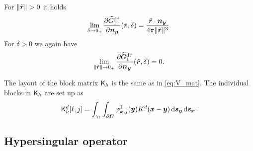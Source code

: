 \documentclass[a4paper,11pt]{article}
\begin{document}
For $\|\tilde {{{\bm{r}}}}\| > 0$ it holds
\begin{equation}
\label{eq:dn_G_dtau_lim_r}
  \lim_{\delta \to 0_+} \frac{\partial \widetilde G^{{\mathrm{d}}\hat\tau}_1}{\partial {\ensuremath{{\bm{n}}}}_{{\bm{y}}}}(\tilde {{{\bm{r}}}},\delta) = \frac{\tilde {{{\bm{r}}}} \cdot {\ensuremath{{\bm{n}}}}_{{\bm{y}}}}{4\pi\|\tilde{{{\bm{r}}}}\|^3}.
\end{equation}
For $\delta > 0$ we again have
\begin{equation*}
  \lim_{\|\tilde {{{\bm{r}}}}\| \to 0_+} \frac{\partial \widetilde G^{{\mathrm{d}}\hat\tau}_1}{\partial {\ensuremath{{\bm{n}}}}_{{\bm{y}}}}(\tilde {{{\bm{r}}}},\delta) = 0.
\end{equation*}

The layout of the block matrix ${{\mathsf{K}}}_h$ is the same as in \eqref{eq:V_mat}. The individual blocks in ${{\mathsf{K}}}_h$ are set up as
\begin{equation*}
  {\ensuremath{{\mathsf{K}}}}^d_h[ \ell , j ] = \int_{\gamma_\ell} \int_{\partial\Omega} \varphi^1_{{{\bm{x}}},j}({{\bm{y}}}) K^d({{\bm{x}}}-{{\bm{y}}}) \,{\mathrm{d}}{{\bm{s}}}_{{\bm{y}}} \,{\mathrm{d}}{{\bm{s}}}_{{\bm{x}}}.
\end{equation*}

\subsection{Hypersingular operator}
\end{document}
